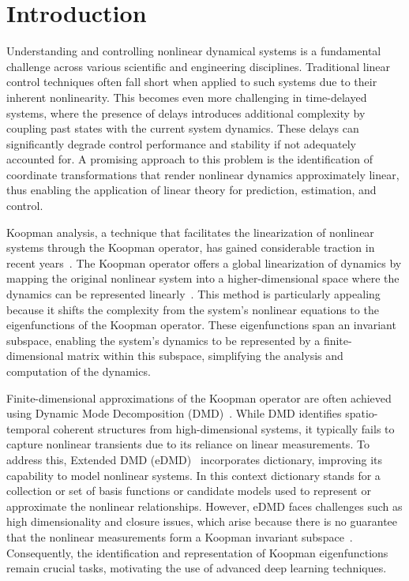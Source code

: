 \documentclass[conference]{IEEEtran}
\begin{document}
\section{Introduction}
Understanding and controlling nonlinear dynamical systems is a fundamental challenge across various scientific and engineering disciplines. Traditional linear control techniques often fall short when applied to such systems due to their inherent nonlinearity. This becomes even more challenging in time-delayed systems, where the presence of delays introduces additional complexity by coupling past states with the current system dynamics. These delays can significantly degrade control performance and stability if not adequately accounted for. A promising approach to this problem is the identification of coordinate transformations that render nonlinear dynamics approximately linear, thus enabling the application of linear theory for prediction, estimation, and control.

Koopman analysis, a technique that facilitates the linearization of nonlinear systems through the Koopman operator, has gained considerable traction in recent years~\cite{Wilson2023siamkoopman, Mauroy2016cdc}. The Koopman operator offers a global linearization of dynamics by mapping the original nonlinear system into a higher-dimensional space where the dynamics can be represented linearly~\cite{Mezic2004101, Mezić2005}.
This method is particularly appealing because it shifts the complexity from the system's nonlinear equations to the eigenfunctions of the Koopman operator. These eigenfunctions span an invariant subspace, enabling the system's dynamics to be represented by a finite-dimensional matrix within this subspace, simplifying the analysis and computation of the dynamics.

Finite-dimensional approximations of the Koopman operator are often achieved using Dynamic Mode Decomposition (DMD)~\cite{schmid2010dynamic}. While DMD identifies spatio-temporal coherent structures from high-dimensional systems, it typically fails to capture nonlinear transients due to its reliance on linear measurements. To address this, Extended DMD (eDMD)~\cite{williams2015data} incorporates dictionary, improving its capability to model nonlinear systems. In this context dictionary stands for a collection or set of basis functions or candidate models used to represent or approximate the nonlinear relationships. However, eDMD faces challenges such as high dimensionality and closure issues, which arise because there is no guarantee that the nonlinear measurements form a Koopman invariant subspace~\cite{Lusch2018}. Consequently, the identification and representation of Koopman eigenfunctions remain crucial tasks, motivating the use of advanced deep learning techniques.
\end{document}
